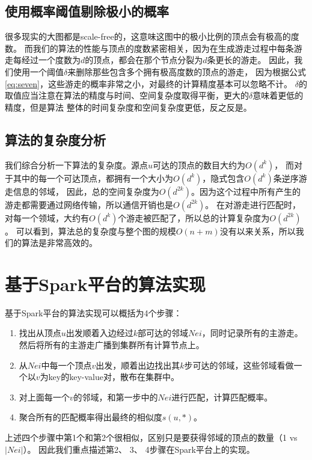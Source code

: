 \documentclass[master]{njuthesis}
\begin{document}
\subsection{使用概率阈值剔除极小的概率}
很多现实的大图都是scale-free\cite{li2005towards}的，这意味这图中的极小比例的顶点会有极高的度数。
而我们的算法的性能与顶点的度数紧密相关，因为在生成游走过程中每条游走每经过一个度数为$d$的顶点，都会在那个节点分裂为$d$条更长的游走。
因此，我们使用一个阈值\cite{lizorkin2008accuracy}$\delta$来删除那些包含多个拥有极高度数的顶点的游走，
因为根据公式\ref{eq:seven}，这些游走的概率非常之小，对最终的计算精度基本可以忽略不计。
$\delta$的取值应当注意在算法的精度与时间、空间复杂度取得平衡，更大的$\delta$意味着更低的精度，但是算法
整体的时间复杂度和空间复杂度更低，反之反是。
\subsection{算法的复杂度分析}
我们综合分析一下算法的复杂度。源点$u$可达的顶点的数目大约为$O(d^k)$，
而对于其中的每一个可达顶点，都拥有一个大小为$O(d^k)$，隐式包含$O(d^k)$条逆序游走信息的邻域，
因此，总的空间复杂度为$O(d^{2k})$。因为这个过程中所有产生的游走都需要通过网络传输，所以通信开销也是$O(d^{2k})$。
在对游走进行匹配时，对每一个领域，大约有$O(d^k)$个游走被匹配了，所以总的计算复杂度为$O(d^{2k})$。
可以看到，算法总的复杂度与整个图的规模$O(n+m)$没有以来关系，所以我们的算法是非常高效的。
\section{基于Spark平台的算法实现}
基于Spark平台的算法实现可以概括为4个步骤：
\begin{enumerate}
 \item 找出从顶点$u$出发顺着入边经过$k$部可达的邻域$Nei$，同时记录所有的主游走。然后将所有的主游走广播到集群所有计算节点上。
 \item 从$Nei$中每一个顶点$v$出发，顺着出边找出其$k$步可达的邻域，这些邻域看做一个以$v$为key的key-value对，散布在集群中。
 \item 对上面每一个$v$的邻域，和第一步中的$Nei$进行匹配，计算匹配概率。
 \item 聚合所有的匹配概率得出最终的相似度$s(u,*)$。
\end{enumerate}
上述四个步骤中第1个和第2个很相似，区别只是要获得邻域的顶点的数量（1 vs $|Nei|$）。
因此我们重点描述第2、 3、 4步骤在Spark平台上的实现。
\end{document}
